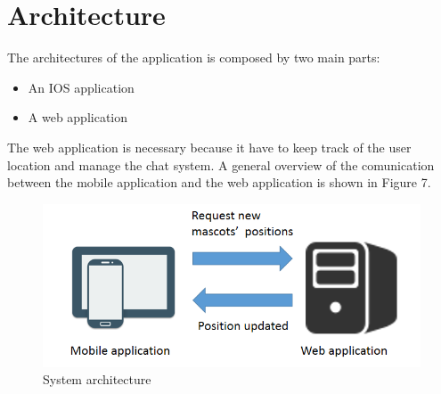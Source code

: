 \section{Architecture}
The architectures of the application is composed by two main parts:
\begin{itemize}
\item An IOS application
\item A web application
\end{itemize}
The web application is necessary because it have to keep track of the user location and manage the chat system. A general overview of the comunication between the mobile application and the web application is shown in Figure 7.

\begin{figure}[H]
\centering
\includegraphics[width=1\textwidth]{./images/architecture.png}
\caption{System architecture}
\label{architecture}
\end{figure}